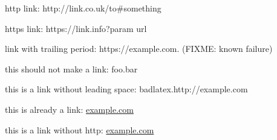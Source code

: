 \documentclass{article}
\begin{document}
http link: http://link.co.uk/to\#something

https link: https://link.info?param url

link with trailing period: https://example.com. (FIXME: known failure)

this should not make a link: foo.bar

this is a link without leading space: badlatex.http://example.com

this is already a link: \href{http://example.com}{example.com}

this is a link without http: \href{example.com}{example.com}
\end{document}
